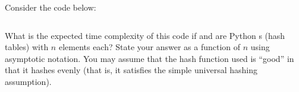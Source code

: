 \begin{prob}
    Consider the code below:

    \inputminted[lastline=6]{python}{\thisdir/code.py}

    What is the expected time complexity of this code if  and
     are Python s (hash tables) with $n$ elements each?
    State your answer as a function of $n$ using asymptotic notation.
    You may assume that the hash function used is ``good'' in that it hashes
    evenly (that is, it satisfies the simple universal hashing assumption).


\end{prob}

